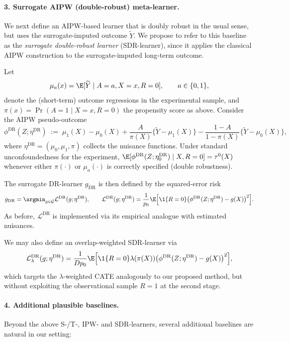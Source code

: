 \documentclass{article} %
\theoremstyle{plain} %
\theoremstyle{definition} %
\theoremstyle{remark} %
\begin{document}
\paragraph{3. Surrogate AIPW (double-robust) meta-learner.}
We next define an AIPW-based learner that is doubly robust in the usual sense, but uses the surrogate-imputed outcome $\widetilde{Y}$. We propose to refer to this baseline as the \emph{surrogate double-robust learner} (SDR-learner), since it applies the classical AIPW construction to the surrogate-imputed long-term outcome.

Let
\[
\mu_a(x) = \E[\widetilde{Y}\mid A=a,X=x,R=0], \qquad a\in\{0,1\},
\]
denote the (short-term) outcome regressions in the experimental sample, and $\pi(x)=\Pr(A=1\mid X=x,R=0)$ the propensity score as above. Consider the AIPW pseudo-outcome
\[
\phi^{\mathrm{DR}}(Z;\eta^{\mathrm{DR}})
  \;:=\;
  \mu_1(X)-\mu_0(X)
  + \frac{A}{\pi(X)}\bigl\{\widetilde{Y}-\mu_1(X)\bigr\}
  - \frac{1-A}{1-\pi(X)}\bigl\{\widetilde{Y}-\mu_0(X)\bigr\},
\]
where $\eta^{\mathrm{DR}}=(\mu_0,\mu_1,\pi)$ collects the nuisance functions. Under standard unconfoundedness for the experiment, $\E[\phi^{\mathrm{DR}}(Z;\eta_0^{\mathrm{DR}})\mid X,R=0]=\tau^0(X)$ whenever either $\pi(\cdot)$ or $\mu_a(\cdot)$ is correctly specified (double robustness).

The surrogate DR-learner $g_{\mathrm{DR}}$ is then defined by the squared-error risk
\[
g_{\mathrm{DR}}
  = \argmin_{g\in\mathcal{G}}
    \mathcal{L}^{\mathrm{DR}}(g;\eta^{\mathrm{DR}}),
\qquad
\mathcal{L}^{\mathrm{DR}}(g;\eta^{\mathrm{DR}})
  = \frac{1}{p_0}\E\Big[\1\{R=0\}\bigl(\phi^{\mathrm{DR}}(Z;\eta^{\mathrm{DR}})-g(X)\bigr)^2\Big].
\]
As before, $\mathcal{L}^{\mathrm{DR}}$ is implemented via its empirical analogue with estimated nuisances.

We may also define an overlap-weighted SDR-learner via
\[
\mathcal{L}^{\mathrm{DR}}_\lambda(g;\eta^{\mathrm{DR}})
  = \frac{1}{D p_0}\E\Big[
      \1\{R=0\}\lambda(\pi(X))
      \bigl(\phi^{\mathrm{DR}}(Z;\eta^{\mathrm{DR}})-g(X)\bigr)^2
    \Big],
\]
which targets the $\lambda$-weighted CATE analogously to our proposed method, but without exploiting the observational sample $R=1$ at the second stage.

\paragraph{4. Additional plausible baselines.}
Beyond the above S-/T-, IPW- and SDR-learners, several additional baselines are natural in our setting:
\end{document}
